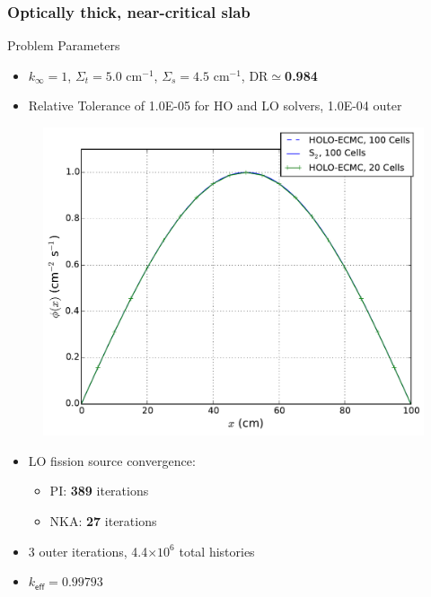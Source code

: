 \documentclass[xcolor=dvipsnames]{beamer}
\newcommand{\keff}[0]{\ensuremath{{k}_{\textsf{eff}}} }
\newcommand{\coly}[1]{{\color{yellow} #1}}
\newlength{\wideitemsep}
\let\olditem\item
\renewcommand{\item}{\setlength{\itemsep}{\wideitemsep}\olditem}
\begin{document}
\begin{frame}
    \frametitle{\coly{Optically thick, near-critical slab}}
    \fontsize{9}{5.0}\selectfont
    \begin{block}{Problem Parameters}
    \begin{itemize}
        \item $k_\infty = 1$, $\Sigma_t = 5.0$ cm$^{-1}$, $\Sigma_s=4.5$ cm$^{-1}$,
            DR$\simeq$\textbf{0.984}
        \item Relative Tolerance of 1.0E-05 for HO and LO solvers, 1.0E-04 outer 
    \end{itemize}\pause
    \end{block}
    \begin{minipage}{0.49\textwidth}
    \begin{figure}
    \centering
    \includegraphics[width=1.08\textwidth]{highdr_fiss_src.pdf}
    \end{figure}
    \end{minipage}
    \begin{minipage}{0.49\textwidth}
        \begin{itemize}
            \item LO fission source convergence:
            \begin{itemize}
                \item \hspace{-0.1in} PI: \textbf{389} iterations
                \item \hspace{-0.1in} NKA: \textbf{27} iterations
            \end{itemize}
        \item 3 outer iterations, 4.4$\times 10^6$ total histories
            \item $\keff = 0.99793$ 
        \end{itemize}
    \end{minipage}
\end{frame}
\end{document}
